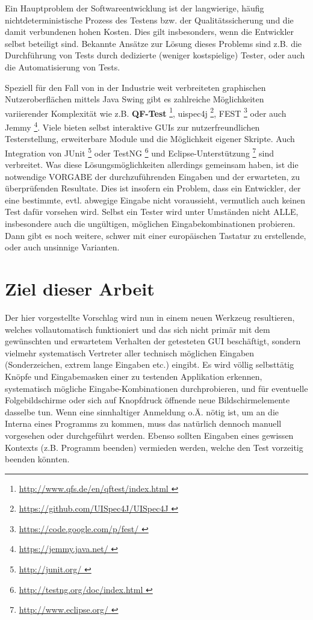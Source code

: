 Ein Hauptproblem der Softwareentwicklung ist der langwierige, häufig nichtdeterministische
Prozess des Testens bzw. der Qualitätssicherung und die damit verbundenen hohen Kosten.
Dies gilt insbesonders, wenn die Entwickler selbst beteiligt sind.
Bekannte Ansätze zur Lösung dieses Problems sind z.B. die Durchführung von Tests
durch dedizierte (weniger kostspielige) Tester, oder auch die Automatisierung von Tests. 
 
Speziell für den Fall von in der Industrie weit verbreiteten graphischen Nutzeroberflächen
mittels Java Swing \cite{JavaSwing} gibt es zahlreiche Möglichkeiten variierender
Komplexität wie z.B. \textbf{QF-Test} \footnote{\url{ http://www.qfs.de/en/qftest/index.html }},
uispec4j \footnote{\url{ https://github.com/UISpec4J/UISpec4J }},
FEST \footnote{\url{ https://code.google.com/p/fest/ }} oder auch 
Jemmy \footnote{\url{ https://jemmy.java.net/ }}. Viele bieten selbst interaktive
GUIs zur nutzerfreundlichen Testerstellung, erweiterbare Module und die Möglichkeit eigener Skripte. Auch
Integration von JUnit \footnote{\url{ http://junit.org/ }} oder 
TestNG \footnote{\url{ http://testng.org/doc/index.html }}
und Eclipse-Unterstützung \footnote{\url{ http://www.eclipse.org/ }} sind verbreitet. Was diese
Lösungsmöglichkeiten allerdings gemeinsam haben, ist die notwendige VORGABE der
durchzuführenden Eingaben und der erwarteten, zu überprüfenden Resultate. Dies ist
insofern ein Problem, dass ein Entwickler, der eine bestimmte, evtl. abwegige Eingabe nicht
voraussieht, vermutlich auch keinen Test dafür vorsehen wird. Selbst ein Tester wird unter
Umständen nicht ALLE, insbesondere auch die ungültigen, möglichen Eingabekombinationen probieren.
Dann gibt es noch weitere, schwer mit einer europäischen Tastatur zu erstellende, oder auch unsinnige Varianten. 
 


\section{Ziel dieser Arbeit}\label{structurelatex}


Der hier vorgestellte Vorschlag wird nun in einem neuen Werkzeug resultieren, welches vollautomatisch
funktioniert und das
sich nicht primär mit dem gewünschten und erwartetem Verhalten der getesteten GUI beschäftigt, sondern
vielmehr systematisch Vertreter aller technisch möglichen Eingaben (Sonderzeichen, extrem
lange Eingaben etc.) eingibt. Es wird völlig selbsttätig Knöpfe und Eingabemasken einer zu testenden
Applikation erkennen, systematisch mögliche Eingabe-Kombinationen durchprobieren, und für eventuelle
Folgebildschirme oder sich auf Knopfdruck öffnende neue Bildschirmelemente dasselbe tun.
Wenn eine sinnhaltiger Anmeldung o.Ä. nötig ist, um an die
\glqq{}Interna\grqq{} eines Programms zu kommen, muss das natürlich dennoch manuell vorgesehen oder
durchgeführt werden. Ebenso sollten Eingaben eines gewissen Kontexts (z.B. \glqq{}Programm beenden\grqq{})
vermieden werden, welche den Test vorzeitig beenden könnten.
 
